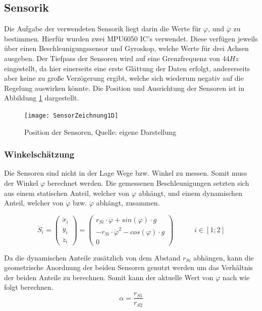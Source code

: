 \subsection{Sensorik}
\label{Sensorik_sec}
Die Aufgabe der verwendeten Sensorik liegt darin die Werte für $\varphi$, und $\dot{\varphi}$ zu bestimmen. Hierfür wurden zwei MPU6050 IC's verwendet. Diese verfügen jeweils über einen Beschleunigungssensor und Gyroskop, welche Werte für drei Achsen ausgeben. Der Tiefpass der Sensoren wird auf eine Grenzfrequenz von $44Hz$ eingestellt, da hier einerseits eine erste Glättung der Daten erfolgt, andererseits aber keine zu große Verzögerung ergibt, welche sich wiederum negativ auf die Regelung auswirken könnte. Die Position und Ausrichtung der Sensoren ist in Abbildung \ref{Position_Sensoren_pic} dargestellt.

\begin{figure}[h]
\texttt{[image: SensorZeichnung1D]}
\caption{Position der Sensoren, Quelle: eigene Darstellung}

\label{Position_Sensoren_pic}
\end{figure}

\subsubsection{Winkelschätzung}
Die Sensoren sind nicht in der Lage Wege bzw. Winkel zu messen. Somit muss der Winkel $\varphi$ berechnet werden. Die gemessenen Beschleunigungen setzten sich aus einem statischen Anteil, welcher von $\varphi$ abhängt, und einem dynamischen Anteil, welcher von $\dot{\varphi}$ bzw. $\ddot{\varphi}$ abhängt, zusammen.

\begin{equation}
\ddot{S}_i = 
\begin{pmatrix}
\ddot{x}_i \\ \ddot{y}_i \\ \ddot{z}_i
\end{pmatrix} =
\begin{pmatrix}
r_{Si} \cdot \ddot{\varphi} + sin(\varphi) \cdot g \\
- r_{Si} \cdot \dot{\varphi}^2 - cos(\varphi) \cdot g \\
0
\end{pmatrix}
\hspace{35pt}
i \in [1;2]
\end{equation}

Da die dynamischen Anteile zusätzlich von dem Abstand $r_{Si}$ abhängen, kann die geometrische Anordnung der beiden Sensoren genutzt werden um das Verhältnis der beiden Anteile zu berechnen. Somit kann der aktuelle Wert von $\varphi$ nach \cite{Cubli1D} wie folgt berechnen.
\begin{equation}
\alpha = \frac{r_{S1}}{r_{S2}}
\end{equation}

